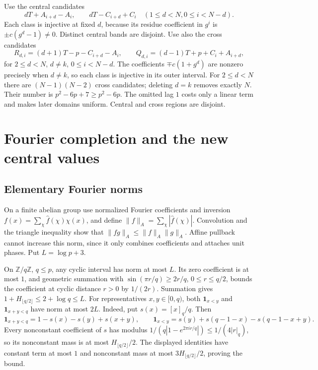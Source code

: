 \documentclass[10pt]{amsart}
\theoremstyle{remark}
\newcommand{\ind}{\mathbf 1}
\newcommand{\normA}[1]{\lVert #1\rVert_A}
\begin{document}
Use the central candidates
\begin{equation}\label{eq:centralcandidates}
 dT+A_{i+d}-A_i,\qquad dT-C_{i+d}+C_i
 \quad(1\le d<N, 0\le i<N-d).
\end{equation}
Each class is injective at fixed $d$, because its residue coefficient
in $g^i$ is $\pm c(g^d-1)\ne0$. Distinct central bands are disjoint.
Use also the cross candidates
\begin{equation}\label{eq:crosscandidates}
 R_{d,i}=(d+1)T-p-C_{i+d}-A_i,\qquad
 Q_{d,i}=(d-1)T+p+C_i+A_{i+d},
\end{equation}
for $2\le d<N$, $d\ne k$, $0\le i<N-d$. The coefficients
$\mp c(1+g^d)$ are nonzero precisely when $d\ne k$, so each class
is injective in its outer interval. For $2\le d<N$ there are
$(N-1)(N-2)$ cross candidates; deleting $d=k$ removes exactly $N$.
Their number is $p^2-6p+7\ge p^2-6p$.
The omitted lag $1$ costs only a linear term and makes later domains
uniform. Central and cross regions are disjoint.

\section{Fourier completion and the new central values}\label{sec:fourier}
\subsection{Elementary Fourier norms}
On a finite abelian group use normalized Fourier coefficients and
inversion $f(x)=\sum_\chi\widehat f(\chi)\chi(x)$, and define
$\normA f=\sum_\chi|\widehat f(\chi)|$. Convolution and the triangle
inequality show that $\normA{fg}\le\normA f\normA g$.
Affine pullback cannot increase this norm, since it only combines
coefficients and attaches unit phases. Put $L=\log p+3$.

On $\mathbb Z/q\mathbb Z$, $q\le p$, any cyclic interval has norm
at most $L$. Its zero coefficient is at most $1$, and geometric
summation with $\sin(\pi r/q)\ge2r/q$, $0\le r\le q/2$, bounds the
coefficient at cyclic distance $r>0$ by $1/(2r)$. Summation gives
$1+H_{\lfloor q/2\rfloor}\le2+\log q\le L$.
For representatives $x,y\in[0,q)$, both $\ind_{x<y}$ and
$\ind_{x+y<q}$ have norm at most $2L$. Indeed, put $s(x)=[x]_q/q$.
Then
\[
 \ind_{x+y<q}=1-s(x)-s(y)+s(x+y),\qquad
 \ind_{x<y}=s(y)+s(q-1-x)-s(q-1-x+y).
\]
Every nonconstant coefficient of $s$ has modulus
$1/(q|1-e^{2\pi ir/q}|)\le1/(4|r|_q)$, so its nonconstant mass
is at most $H_{\lfloor q/2\rfloor}/2$. The displayed identities
have constant term at most $1$ and nonconstant mass at most
$3H_{\lfloor q/2\rfloor}/2$, proving the bound.
\end{document}
